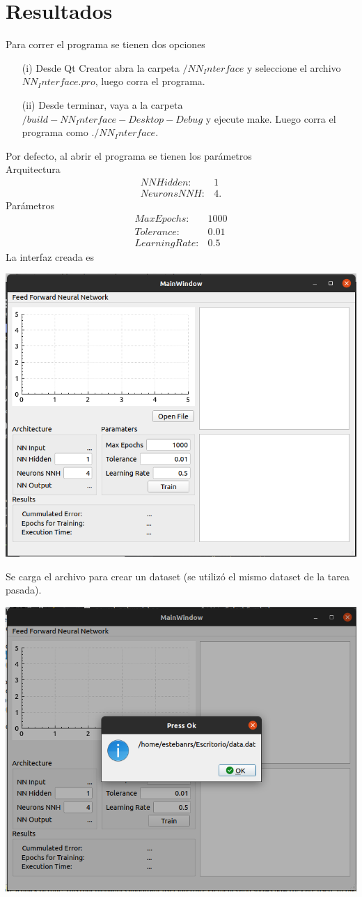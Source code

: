 \documentclass[12pt,letterpaper]{article}
\theoremstyle{definition}
\theoremstyle{definition}
\theoremstyle{definition}
\theoremstyle{definition}
\theoremstyle{definition}
\theoremstyle{definition}
\begin{document}
\section{Resultados}
Para correr el programa se tienen dos opciones
\begin{itemize}
	\item[(i)] Desde Qt Creator abra la carpeta $ /NN_Interface $ y seleccione el archivo $ NN_Interface.pro $, luego corra el programa.
	\item[(ii)] Desde terminar, vaya a la carpeta $ /build-NN_Interface-Desktop-Debug $ y ejecute make. Luego corra el programa como $ ./NN_Interface $.
\end{itemize}
Por defecto, al abrir el programa se tienen los parámetros\\
Arquitectura
\begin{eqnarray*}
	NN Hidden  : & 1 \\
	Neurons NNH: & 4.
\end{eqnarray*}
Parámetros
\begin{eqnarray*}
	Max Epochs  : & 1000 \\
	Tolerance   : & 0.01 \\
	Learning Rate: & 0.5
\end{eqnarray*}
\newpage
La interfaz creada es
\begin{center}
	\includegraphics[width=0.7\linewidth]{interfaz}
\end{center}
Se carga el archivo para crear un dataset (se utilizó el mismo dataset de la tarea pasada).
\begin{center}
	\includegraphics[width=0.7\linewidth]{archivo}
\end{center}
\end{document}
